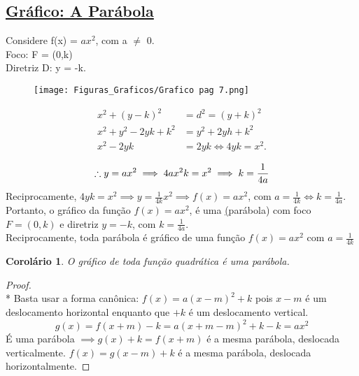 \documentclass{article}
\newtheorem*{corollary}{Corolário}
\begin{document}
\pagebreak
\subsection*{\underline{Gráfico: A Parábola}}

\begin{flushleft}
Considere f(x) = $ax^2$, com a $\neq$ 0. \\
Foco: F = (0,k) \\
Diretriz D: y = -k.\\   
\end{flushleft}

\begin{figure}[H]
    \centering
    \texttt{[image: Figuras\_Graficos/Grafico pag 7.png]}
    \label{Grafico pag7}
\end{figure}

\begin{align*}
    x^2 + (y-k)^2 &= d^2 = (y+k)^2\\
    x^2+y^2 - 2yk + k^2 &= y^2 + 2yh + k^2  \\
    x^2 - 2yk &= 2yk \Leftrightarrow 4yk = x^2.\\
\end{align*}
\[
\therefore \space y=ax^2 \implies 4ax^2k = x^2 \implies k = \frac{1}{4a}
\]
Reciprocamente, $4yk = x^2 \implies y = \frac{1}{4k}x^2\implies f(x) = ax^2$, 
com $a=\frac{1}{4k}\Leftrightarrow k = \frac{1}{4a}$. \\
Portanto, o gráfico da função $f(x) = ax^2$, é uma \underline(parábola) com foco $F = (0,k)$ e 
diretriz $y = -k$, com $k=\frac{1}{4a}$.\\
Reciprocamente, toda parábola é gráfico de uma função $f(x) = ax^2$ com $a = \frac{1}{4k}$

\pagebreak

\begin{corollary}
    O gráfico de toda função quadrática é uma parábola.
\end{corollary} 

\begin{proof}\mbox{}\\*
Basta usar a forma canônica: $f(x) = a(x-m)^2 + k$ pois $x-m$ é um deslocamento horizontal enquanto que $+k$ é um deslocamento vertical.
\[
g(x) = f(x+m) - k = a(x+m-m)^2 + k - k = ax^2
\]
É uma parábola $\implies g(x)+k=f(x+m)$ é a mesma parábola, deslocada verticalmente. $f(x) = g(x-m)+k$ é a mesma parábola, deslocada horizontalmente.
\end{proof}
\end{document}
